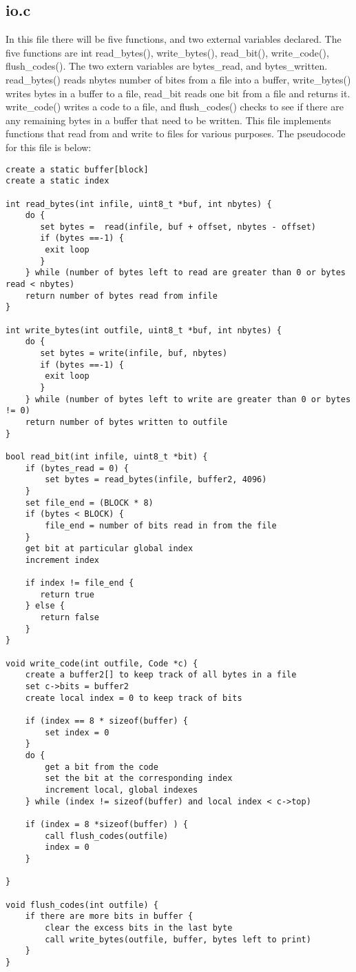 \documentclass[11pt]{article}
\begin{document}
\subsection{io.c}
In this file there will be five functions, and two external variables declared. The five functions are int read\_bytes(), write\_bytes(), read\_bit(), write\_code(), flush\_codes(). The two extern variables are bytes\_read, and bytes\_written. read\_bytes() reads nbytes number of bites from a file into a buffer, write\_bytes() writes bytes in a buffer to a file, read\_bit reads one bit from a file and returns it. write\_code() writes a code to a file, and flush\_codes() checks to see if there are any remaining bytes in a buffer that need to be written. This file implements functions that read from and write to files for various purposes. The pseudocode for this file is below:

\begin{verbatim}
create a static buffer[block]
create a static index

int read_bytes(int infile, uint8_t *buf, int nbytes) {
    do {
       set bytes =  read(infile, buf + offset, nbytes - offset)
       if (bytes ==-1) {
        exit loop
       }
    } while (number of bytes left to read are greater than 0 or bytes read < nbytes)
    return number of bytes read from infile
}

int write_bytes(int outfile, uint8_t *buf, int nbytes) {
    do {
       set bytes = write(infile, buf, nbytes)
       if (bytes ==-1) {
        exit loop
       }
    } while (number of bytes left to write are greater than 0 or bytes != 0)
    return number of bytes written to outfile
}

bool read_bit(int infile, uint8_t *bit) {
    if (bytes_read = 0) {
        set bytes = read_bytes(infile, buffer2, 4096)
    }
    set file_end = (BLOCK * 8)
    if (bytes < BLOCK) {
        file_end = number of bits read in from the file
    }
    get bit at particular global index
    increment index
    
    if index != file_end {
       return true
    } else {
       return false
    }
}

void write_code(int outfile, Code *c) {
    create a buffer2[] to keep track of all bytes in a file
    set c->bits = buffer2
    create local index = 0 to keep track of bits
    
    if (index == 8 * sizeof(buffer) {
        set index = 0
    }
    do {
        get a bit from the code 
        set the bit at the corresponding index
        increment local, global indexes
    } while (index != sizeof(buffer) and local index < c->top)

    if (index = 8 *sizeof(buffer) ) {
        call flush_codes(outfile)
        index = 0
    }

}

void flush_codes(int outfile) {
    if there are more bits in buffer {
        clear the excess bits in the last byte
        call write_bytes(outfile, buffer, bytes left to print)
    }
}

\end{verbatim}
\end{document}
